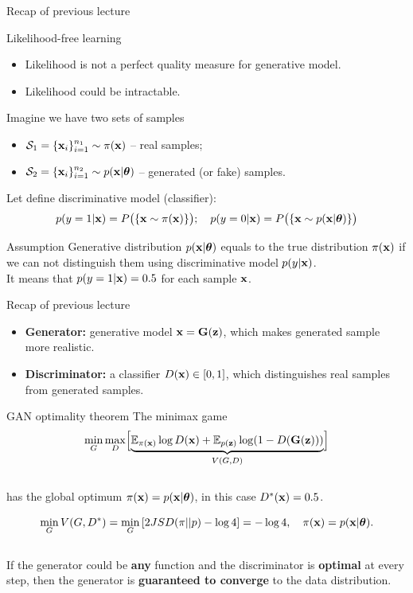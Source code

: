 \begin{frame}{Recap of previous lecture}
	\begin{block}{Likelihood-free learning}
		\begin{itemize}
			\item Likelihood is not a perfect quality measure for generative model.
			\item Likelihood could be intractable.
		\end{itemize}
	\end{block}
	Imagine we have two sets of samples 
	\begin{itemize}
		\item $\mathcal{S}_1 = \{\mathbf{x}_i\}_{i=1}^{n_1} \sim \pi(\mathbf{x})$ -- real samples;
		\item $\mathcal{S}_2 = \{\mathbf{x}_i\}_{i=1}^{n_2} \sim p(\mathbf{x} | \boldsymbol{\theta})$ -- generated (or fake) samples.
	\end{itemize}
	Let define discriminative model (classifier):
	\[
		p(y = 1 | \mathbf{x}) = P\bigl(\{\mathbf{x} \sim \pi(\mathbf{x})\}\bigr); \quad p(y = 0 | \mathbf{x}) = P\bigl(\{\mathbf{x} \sim p(\mathbf{x} | \boldsymbol{\theta})\}\bigr)
	\]
	\vspace{-0.5cm}
	\begin{block}{Assumption}
		Generative distribution $p(\mathbf{x} | \boldsymbol{\theta})$ equals to the true distribution $\pi(\mathbf{x})$ if we can not distinguish them using discriminative model $p(y | \mathbf{x})$. \\
		It means that $p(y = 1 | \mathbf{x}) = 0.5$ for each sample $\mathbf{x}$.
	\end{block}
\end{frame}
\begin{frame}{Recap of previous lecture}
	\begin{itemize}
		\item \textbf{Generator:} generative model $\mathbf{x} = \mathbf{G}(\mathbf{z})$, which makes generated sample more realistic.
		\item \textbf{Discriminator:} a classifier $D(\mathbf{x}) \in [0, 1]$, which distinguishes real samples from generated samples.
	\end{itemize}
	\vspace{-0.1cm}
	\begin{block}{GAN optimality theorem}
		The minimax game 
		\vspace{-0.3cm}
		\[
		\min_{G} \max_D \Bigl[ \underbrace{\mathbb{E}_{\pi(\mathbf{x})} \log D(\mathbf{x}) + \mathbb{E}_{p(\mathbf{z})} \log (1 - D(\mathbf{G}(\mathbf{z})))}_{V(G, D)} \Bigr]
		\]
		\vspace{-0.5cm} \\
		has the global optimum $\pi(\mathbf{x}) = p(\mathbf{x} | \boldsymbol{\theta})$, in this case $D^*(\mathbf{x}) = 0.5$.
	\end{block}
	\[
		\min_{G} V(G, D^*) = \min_{G} \left[ 2 JSD(\pi || p) - \log 4 \right] = -\log 4, \quad \pi(\mathbf{x}) = p(\mathbf{x} | \boldsymbol{\theta}).
	\]
	\vspace{-0.5cm} \\
	If the generator could be \textbf{any} function and the discriminator is \textbf{optimal} at every step, then the generator is \textbf{guaranteed to converge} to the data distribution.
\end{frame}
